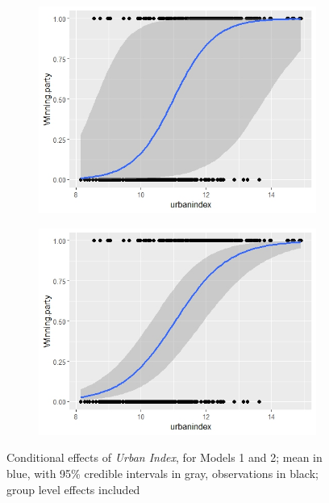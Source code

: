 \documentclass[12pt]{article}
\begin{document}
\begin{figure}[h] 
	\centering
	\begin{subfigure}{0.45\textwidth}
		\centering
		\includegraphics[width=\linewidth]{results/cond_eff_urb_model1_groupeff.jpeg}
		\label{fig:subfig1}
	\end{subfigure}
	\hfill
	\begin{subfigure}{0.45\textwidth}
		\centering
		\includegraphics[width=\linewidth]{results/cond_eff_urb_model2_groupeff.jpeg}
		\label{fig:subfig2}
	\end{subfigure}
	\caption{Conditional effects of \textit{Urban Index}, for Models 1 and 2; mean in blue, with 95\% credible intervals in gray, observations in black;  group level effects included}
	\label{fig:cond_effects}
\end{figure}
\end{document}
